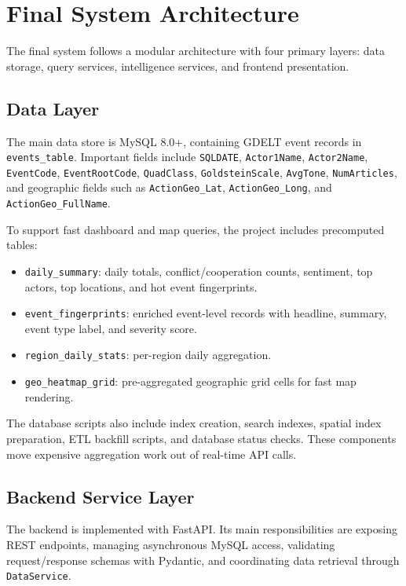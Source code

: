 \documentclass[11pt]{article}
\begin{document}
\section{Final System Architecture}

The final system follows a modular architecture with four primary layers: data storage, query services, intelligence services, and frontend presentation.

\subsection{Data Layer}

The main data store is MySQL 8.0+, containing GDELT event records in \texttt{events\_table}. Important fields include \texttt{SQLDATE}, \texttt{Actor1Name}, \texttt{Actor2Name}, \texttt{EventCode}, \texttt{EventRootCode}, \texttt{QuadClass}, \texttt{GoldsteinScale}, \texttt{AvgTone}, \texttt{NumArticles}, and geographic fields such as \texttt{ActionGeo\_Lat}, \texttt{ActionGeo\_Long}, and \texttt{ActionGeo\_FullName}.

To support fast dashboard and map queries, the project includes precomputed tables:

\begin{itemize}
    \item \texttt{daily\_summary}: daily totals, conflict/cooperation counts, sentiment, top actors, top locations, and hot event fingerprints.
    \item \texttt{event\_fingerprints}: enriched event-level records with headline, summary, event type label, and severity score.
    \item \texttt{region\_daily\_stats}: per-region daily aggregation.
    \item \texttt{geo\_heatmap\_grid}: pre-aggregated geographic grid cells for fast map rendering.
\end{itemize}

The database scripts also include index creation, search indexes, spatial index preparation, ETL backfill scripts, and database status checks. These components move expensive aggregation work out of real-time API calls.

\subsection{Backend Service Layer}

The backend is implemented with FastAPI. Its main responsibilities are exposing REST endpoints, managing asynchronous MySQL access, validating request/response schemas with Pydantic, and coordinating data retrieval through \texttt{DataService}.
\end{document}

